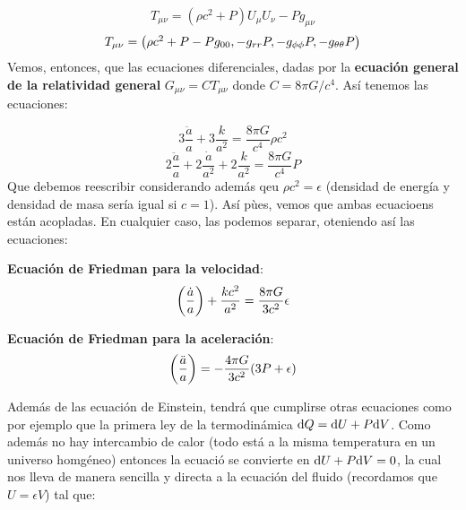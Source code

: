 \begin{equation}
	T_{\mu \nu} = (\rho c^2 + P) U_\mu U_\nu - P g_{\mu \nu}
\end{equation}
\begin{equation}
	T_{\mu \nu} = \mqty({\rho c^2 + P - P g_{00},
		- g_{rr} P,
		- g_{\phi \phi} P,
		- g_{\theta \theta} P})
\end{equation}
Vemos, entonces, que las ecuaciones diferenciales, dadas por la \textbf{ecuación general de la relatividad general} $G_{\mu \nu} = C T_{\mu \nu}$ donde $C=8\pi G / c^4$. Así tenemos las ecuaciones:

\begin{equation}
	3 \frac{\ddot{a}}{a}+ 3 \frac{k}{a^2} =  \frac{8 \pi G}{c^4} \rho c^2
\end{equation}
\begin{equation}
	2\frac{\ddot{a}}{a} + 2 \frac{\dot{a}}{a^2}+2\frac{k}{a^2} =  \frac{8 \pi G}{c^4}  P
\end{equation}
Que debemos reescribir considerando además qeu $\rho c^2 = \epsilon$ (densidad de energía y densidad de masa sería igual si $c=1$). Así pùes, vemos que ambas ecuacioens están acopladas. En cualquier caso, las podemos separar, oteniendo así las ecuaciones:

\begin{Resaltar}
	\begin{center}
		\textbf{Ecuación de Friedman para la velocidad}:
		\begin{equation}
			\left( \frac{\dot{a}}{a} \right) + \frac{kc^2}{a^2} = \frac{8 \pi G}{3c^2} \epsilon
		\end{equation}
	\end{center}
\end{Resaltar}
\begin{Resaltar}
	\begin{center}
		\textbf{Ecuación de Friedman para la aceleración}:
		\begin{equation}
			\left( \frac{\ddot{a}}{a} \right) =  - \frac{4 \pi G}{3c^2} (3P + \epsilon)
		\end{equation}
	\end{center}
\end{Resaltar}

Además de las ecuación de Einstein, tendrá que cumplirse otras ecuaciones como por ejemplo que la primera ley de la termodinámica $\mathrm{d} Q = \mathrm{d} U + P \mathrm{d} V$. Como además no hay intercambio de calor (todo está a la misma temperatura en un universo homgéneo) entonces la ecuació se convierte en $\mathrm{d} U + P \mathrm{d} V = 0$, la cual nos lleva de manera sencilla y directa a la ecuación del fluido (recordamos que $U=\epsilon V$) tal que:


